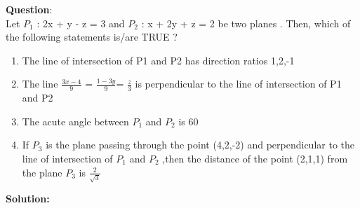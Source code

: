 \documentclass[journal]{IEEEtran}
\begin{document}
\textbf{Question}:\\
Let $P_1$ : 2x + y - z = 3 and $P_2$ : x + 2y + z = 2 be two planes . Then, which of the following statements is/are TRUE ?
\begin{enumerate}
    \item The line of intersection of P1 and P2 has direction ratios 1,2,-1
    \item The line $\frac{3x-4}{9}$ = $\frac{1-3y}{9} $= $\frac{z}{3}$ is perpendicular to the line of intersection of P1 and P2
    \item The acute angle between $P_1$ and $P_2$ is 60\degree
    \item If $P_3$ is the plane passing through the point (4,2,-2) and perpendicular to the line of intersection of $P_1$ and $P_2$ ,then the distance of the point (2,1,1) from the plane $P_3$ is $\frac{2}{\sqrt{3}}$
\end{enumerate}
\textbf{Solution: }
\end{document}
